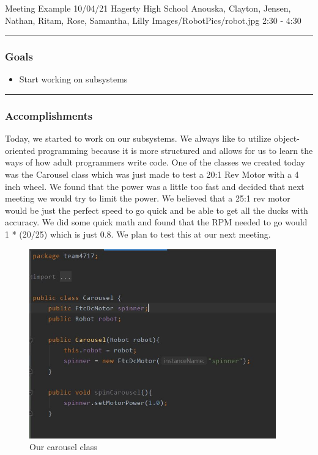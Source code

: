 \insertmeeting 
	{Meeting Example} 
	{10/04/21} 
	{Hagerty High School}
	{Anouska, Clayton, Jensen, Nathan, Ritam, Rose, Samantha, Lilly}
	{Images/RobotPics/robot.jpg}
	{2:30 - 4:30}
	
\noindent\hfil\rule{\textwidth}{.4pt}\hfil
\subsubsection*{Goals}
\begin{itemize}
    \item Start working on subsystems  

\end{itemize} 

\noindent\hfil\rule{\textwidth}{.4pt}\hfil

\subsubsection*{Accomplishments}
Today, we started to work on our subsystems. We always like to utilize object-oriented programming because it is more structured and allows for us to learn the ways of how adult programmers write code. One of the classes we created today was the Carousel class which was just made to test a 20:1 Rev Motor with a 4 inch wheel. We found that the power was a little too fast and decided that next meeting we would try to limit the power. We believed that a 25:1 rev motor would be just the perfect speed to go quick and be able to get all the ducks with accuracy. We did some quick math and found that the RPM needed to go would 1 * (20/25) which is just 0.8. We plan to test this at our next meeting.


\begin{figure}[htp]
\centering
\includegraphics[width=0.95\textwidth, angle=0]{Meetings/October/10-04-21/Capture - Ritam R.JPG}
\caption{Our carousel class}
\label{fig:pic1}
\end{figure}



